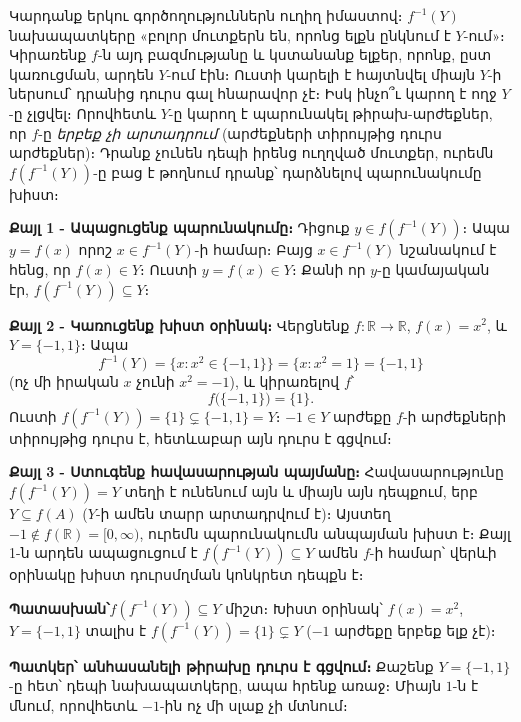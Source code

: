 \documentclass[11pt,a4paper]{article}
\newcommand{\R}{\mathbb{R}}
\newcommand{\answer}[1]{\begin{answerbox}\centering\textbf{Պատասխան՝}\quad #1\end{answerbox}}
\begin{document}
\begin{ideabox}
Կարդանք երկու գործողություններն ուղիղ իմաստով։ $f^{-1}(Y)$ նախապատկերը «բոլոր մուտքերն են, որոնց
ելքն ընկնում է $Y$-ում»։ Կիրառենք $f$-ն այդ բազմությանը և կստանանք ելքեր, որոնք, ըստ
կառուցման, արդեն $Y$-ում էին։ Ուստի կարելի է հայտնվել միայն $Y$-ի ներսում՝ դրանից դուրս գալ հնարավոր
չէ։ Իսկ ինչո՞ւ կարող է ողջ $Y$-ը չլցվել։ Որովհետև $Y$-ը կարող է պարունակել թիրախ-արժեքներ, որ $f$-ը \emph{երբեք չի
արտադրում} (արժեքների տիրույթից դուրս արժեքներ)։ Դրանք չունեն դեպի իրենց ուղղված մուտքեր, ուրեմն
$f(f^{-1}(Y))$-ը բաց է թողնում դրանք՝ դարձնելով պարունակումը խիստ։
\end{ideabox}

\textbf{Քայլ 1 - Ապացուցենք պարունակումը։} Դիցուք $y\in f(f^{-1}(Y))$։ Ապա $y=f(x)$ որոշ
$x\in f^{-1}(Y)$-ի համար։ Բայց $x\in f^{-1}(Y)$ նշանակում է հենց, որ $f(x)\in Y$։ Ուստի $y=f(x)\in Y$։ Քանի որ $y$-ը
կամայական էր, $f(f^{-1}(Y))\subseteq Y$։

\textbf{Քայլ 2 - Կառուցենք խիստ օրինակ։} Վերցնենք $f:\R\to\R$, $f(x)=x^2$, և $Y=\{-1,1\}$։ Ապա
\[
f^{-1}(Y)=\{x:x^2\in\{-1,1\}\}=\{x:x^2=1\}=\{-1,1\}
\]
(ոչ մի իրական $x$ չունի $x^2=-1$), և կիրառելով $f$՝
\[
f\bigl(\{-1,1\}\bigr)=\{1\}.
\]
Ուստի $f(f^{-1}(Y))=\{1\}\subsetneq\{-1,1\}=Y$։ $-1\in Y$ արժեքը $f$-ի արժեքների տիրույթից դուրս է, հետևաբար այն
դուրս է գցվում։

\textbf{Քայլ 3 - Ստուգենք հավասարության պայմանը։} Հավասարությունը $f(f^{-1}(Y))=Y$ տեղի է ունենում այն և միայն այն
դեպքում, երբ $Y\subseteq f(A)$ ($Y$-ի ամեն տարր արտադրվում է)։ Այստեղ $-1\notin f(\R)=[0,\infty)$, ուրեմն
պարունակումն անպայման խիստ է։ Քայլ 1-ն արդեն ապացուցում է $f(f^{-1}(Y))\subseteq Y$ ամեն $f$-ի համար՝ վերևի
օրինակը խիստ դուրսմղման կոնկրետ դեպքն է։

\answer{$f(f^{-1}(Y))\subseteq Y$ միշտ։ Խիստ օրինակ՝ $f(x)=x^2$, $Y=\{-1,1\}$ տալիս է
$f(f^{-1}(Y))=\{1\}\subsetneq Y$ ($-1$ արժեքը երբեք ելք չէ)։}

\medskip
\textbf{Պատկեր՝ անհասանելի թիրախը դուրս է գցվում։} Քաշենք $Y=\{-1,1\}$-ը հետ՝ դեպի նախապատկերը, ապա
հրենք առաջ։ Միայն $1$-ն է մնում, որովհետև $-1$-ին ոչ մի սլաք չի մտնում։
\end{document}
